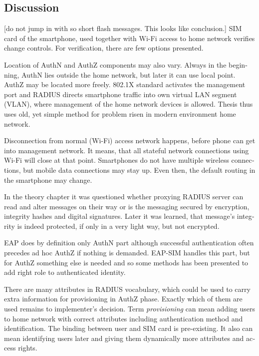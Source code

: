 \documentclass[12pt,a4paper,english]{tutthesis}
\begin{document}
\begin{otherlanguage}{english}
{\section{Discussion}
\label{sec-6-5}


[do not jump in with so short flash messages. This looks like conclusion.] 
SIM card of the smartphone, used together with Wi-Fi access to home network 
verifies change controls. For verification, there are few options presented.

Location of AuthN and AuthZ components may also vary.
Always in the beginning, AuthN lies outside the home network, but
later it can use local point. AuthZ may be located more freely.
802.1X standard activates the management port and
RADIUS directs smartphone traffic into own virtual LAN segment (VLAN),
where management of the home network devices is allowed.
Thesis thus uses old, yet simple method for problem risen in modern environment home network.

Disconnection from normal (Wi-Fi) access network happens, before phone can get
into management network. It means, that all stateful network
connections using Wi-Fi will close at that point. Smartphones do not
have multiple wireless connections, but mobile data connections may 
stay up. Even then, the default routing in the smartphone may change.

In the theory chapter it was questioned whether proxying RADIUS server
can read and alter messages on their way or is the messaging secured
by encryption, integrity hashes and digital signatures.
Later it was learned, that message's integrity is indeed protected, if
only in a very light way, but not encrypted.


EAP does by definition only AuthN part although successful
authentication often precedes ad hoc AuthZ if nothing is demanded.
EAP-SIM handles this part, but for AuthZ something else is needed
and so some methods has been presented to add right role to 
authenticated identity.

There are many attributes in RADIUS vocabulary, which could be 
used to carry extra information for provisioning in AuthZ phase. Exactly which
of them are used remains to implementer's  decision.
Term \emph{provisioning} can mean adding users to home network with correct
attributes including authentication method and identification.
The binding between user and SIM card is pre-existing.
It also can mean identifying users later and giving them 
dynamically more attributes and access rights.

}
\end{otherlanguage}
\end{document}
